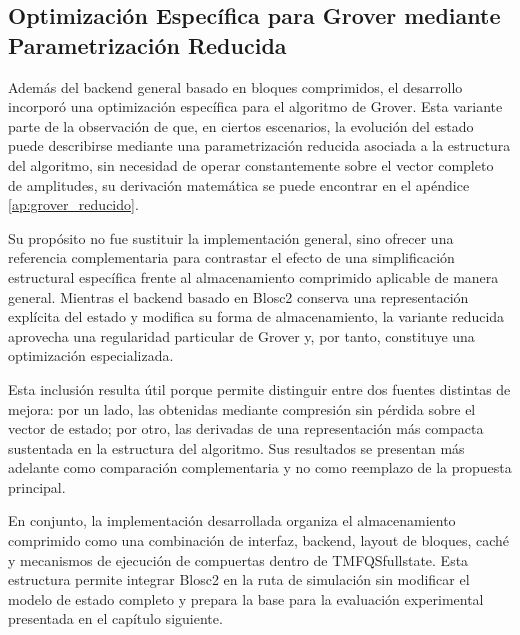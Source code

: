 \subsection{Optimización Específica para Grover mediante Parametrización Reducida}
\label{subsec:grover_reducido_impl}

Además del backend general basado en bloques comprimidos, el desarrollo incorporó una
optimización específica para el algoritmo de Grover. Esta variante parte de la
observación de que, en ciertos escenarios, la evolución del estado puede describirse
mediante una parametrización reducida asociada a la estructura del algoritmo, sin
necesidad de operar constantemente sobre el vector completo de amplitudes, 
su derivación matemática se puede encontrar en el apéndice \ref{ap:grover_reducido}.

Su propósito no fue sustituir la implementación general, sino ofrecer una referencia
complementaria para contrastar el efecto de una simplificación estructural específica
frente al almacenamiento comprimido aplicable de manera general. Mientras el backend
basado en Blosc2 conserva una representación explícita del estado y modifica su forma
de almacenamiento, la variante reducida aprovecha una regularidad particular de Grover
y, por tanto, constituye una optimización especializada.

Esta inclusión resulta útil porque permite distinguir entre dos fuentes distintas de mejora:
por un lado, las obtenidas mediante compresión sin pérdida sobre el vector de estado; por
otro, las derivadas de una representación más compacta sustentada en la estructura del
algoritmo. Sus resultados se presentan más adelante como comparación complementaria
y no como reemplazo de la propuesta principal.

En conjunto, la implementación desarrollada organiza el almacenamiento comprimido
como una combinación de interfaz, backend, layout de bloques, caché y mecanismos de
ejecución de compuertas dentro de TMFQSfullstate. Esta estructura permite integrar
Blosc2 en la ruta de simulación sin modificar el modelo de estado completo y prepara la
base para la evaluación experimental presentada en el capítulo siguiente.
